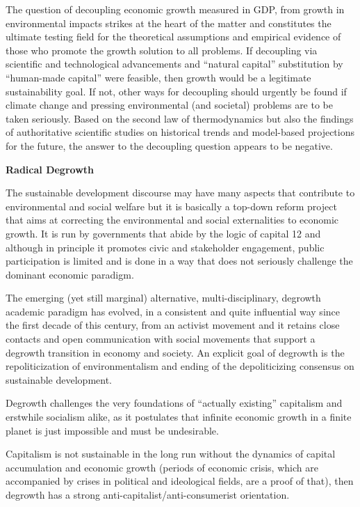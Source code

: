 \documentclass[
]{book}
\begin{document}
The question of decoupling economic growth measured in GDP, from growth in environmental impacts
strikes at the heart of the matter and constitutes the ultimate testing field for the theoretical assumptions and
empirical evidence of those who promote the growth solution to all problems. If decoupling via scientific and
technological advancements and ``natural capital'' substitution by ``human-made capital'' were feasible, then
growth would be a legitimate sustainability goal. If not, other ways for decoupling should urgently be found if
climate change and pressing environmental (and societal) problems are to be taken seriously.
Based on the second law of thermodynamics but also the findings of authoritative scientific studies on
historical trends and model-based projections for the future, the answer to the decoupling question appears to
be negative.

\textbf{Radical Degrowth}

The sustainable development discourse may have many aspects that contribute to environmental and
social welfare but it is basically a top-down reform project that aims at correcting the environmental and social
externalities to economic growth. It is run by governments that abide by the logic of capital 12 and although in
principle it promotes civic and stakeholder engagement, public participation is limited and is done in a way that
does not seriously challenge the dominant economic paradigm.

The emerging (yet still marginal) alternative, multi-disciplinary, degrowth
academic paradigm
has evolved, in a consistent and quite influential way since the first decade
of this century, from an activist movement and it retains close contacts and open communication with social
movements that support a degrowth transition in economy and society.
An explicit goal of degrowth is the
repoliticization of environmentalism and ending of the depoliticizing consensus on sustainable development.

Degrowth challenges the very foundations of ``actually existing'' capitalism and erstwhile
socialism alike, as it postulates that infinite economic growth in a finite planet is just impossible and must be
undesirable.

Capitalism is not sustainable in the long run without the dynamics of capital accumulation and
economic growth (periods of economic crisis, which are accompanied by crises in political and ideological
fields, are a proof of that), then degrowth has a strong anti-capitalist/anti-consumerist orientation.
\end{document}
